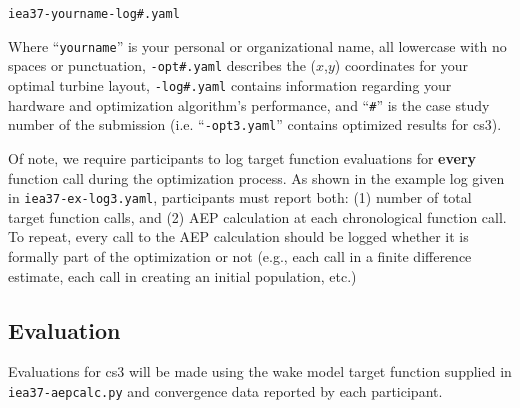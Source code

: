 \documentclass[10pt]{article}
\begin{document}
        \texttt{iea37-yourname-log\#.yaml}
        \vspace{0.5em}
        
        \noindent Where ``\texttt{yourname}'' is your personal or organizational name, all lowercase with no spaces or punctuation,
            \texttt{-opt\#.yaml} describes the ($x$,$y$) coordinates for your optimal turbine layout,
            \texttt{-log\#.yaml} contains information regarding your hardware and optimization algorithm's performance,
            and ``\texttt{\#}'' is the case study number of the submission (i.e. ``\texttt{-opt3.yaml}'' contains optimized results for cs3).


        Of note, we require participants to log target function evaluations for \textbf{every} function call during the optimization process.
        As shown in the example log given in \texttt{iea37-ex-log3.yaml}, participants must report both: (1) number of total target function calls, and (2) AEP calculation at each chronological function call.
        To repeat, every call to the AEP calculation should be logged whether it is formally part of the optimization or not (e.g., each call in a finite difference estimate, each call in creating an initial population, etc.)

    \subsection{Evaluation}
    \label{sec:Evaluation}
        Evaluations for cs3 will be made using the wake model target function supplied in \texttt{iea37-aepcalc.py} and convergence data reported by each participant.
        
\end{document}

